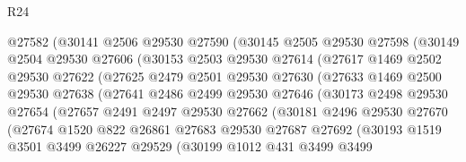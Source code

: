 \begin{lexlean}{R24}
\begin{coremodule}
                @27582
                (@30141
                  @2506
                  @29530
                  @27590
                  (@30145
                    @2505
                    @29530
                    @27598
                    (@30149
                      @2504
                      @29530
                      @27606
                      (@30153
                        @2503
                        @29530
                        @27614
                        (@27617
                          @1469
                          @2502
                          @29530
                          @27622
                          (@27625
                            @2479
                            @2501
                            @29530
                            @27630
                            (@27633
                              @1469
                              @2500
                              @29530
                              @27638
                              (@27641
                                @2486
                                @2499
                                @29530
                                @27646
                                (@30173
                                  @2498
                                  @29530
                                  @27654
                                  (@27657
                                    @2491
                                    @2497
                                    @29530
                                    @27662
                                    (@30181
                                      @2496
                                      @29530
                                      @27670
                                      (@27674
                                        @1520
                                        @822
                                        @26861
                                        @27683
                                        @29530
                                        @27687
                                        @27692
                                        (@30193
                                          @1519
                                          @3501
                                          @3499
                                          @26227
                                          @29529
                                          (@30199
                                            @1012
                                            @431
                                            @3499
                                            @3499

\end{coremodule}
\end{lexlean}
